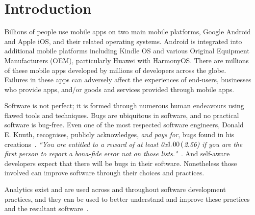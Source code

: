 \chapter{Introduction}
\label{the-introduction}

Billions of people use mobile apps on two main mobile platforms, Google Android and Apple iOS, and their related operating systems.  Android is integrated into additional mobile platforms including Kindle OS and various Original Equipment Manufacturers (OEM), particularly Huawei with HarmonyOS. There are millions of these mobile apps developed by millions of developers across the globe. Failures in these apps can adversely affect the experiences of end-users, businesses who provide apps, and/or goods and services provided through mobile apps. 

Software is not perfect; it is formed through numerous human endeavours using flawed tools and techniques. 
Bugs are ubiquitous in software, and no practical software is bug-free. Even one of the most respected software engineers, Donald E. Knuth, recognises, publicly acknowledges, \emph{and pays for}, bugs found in his creations~\citep{knuth_trutex, wikipedia__knuth_reward_checks_2020}. \emph{``You are entitled to a reward of at least 0x$1.00 \nobreak\hspace{.16667em plus .08333em} ($2.56) if you are the first person to report a bona-fide error not on those lists."}~\citep{knuth_the_bank_of_san_serriffe}. And self-aware developers expect that there will be bugs in their software. Nonetheless those involved can improve software through their choices and practices.

Analytics exist and are used across and throughout software development practices, and they can be used to better understand and improve these practices and the resultant software~\citep{buse_analytics_2010, buse2012_information_needs_for_software_development_analytics, menzies2018_unreasonable_effectiveness_of_software_analytics}.

